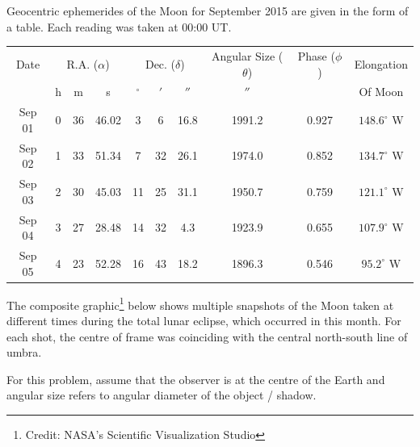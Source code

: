 Geocentric ephemerides of the Moon for September 2015 are given in the form
of a table. Each reading was taken at 00:00 UT.

\begin{center}
\begin{tabular}{c|ccc|ccc|c|c|c}
Date & \multicolumn{3}{c|}{R.A. ($\alpha$)}
  & \multicolumn{3}{c|}{Dec. ($\delta$)}
  & Angular Size ($\theta$) & Phase ($\phi$) & Elongation \\
 & h & m & s & $^\circ$ & $'$ & $''$ & $''$ & & Of Moon \\
\hline
Sep 01 & 0 & 36 & 46.02 & 3  & 6  & 16.8 & 1991.2 & 0.927 & $148.6^\circ$ W \\
Sep 02 & 1 & 33 & 51.34 & 7  & 32 & 26.1 & 1974.0 & 0.852 & $134.7^\circ$ W \\
Sep 03 & 2 & 30 & 45.03 & 11 & 25 & 31.1 & 1950.7 & 0.759 & $121.1^\circ$ W \\
Sep 04 & 3 & 27 & 28.48 & 14 & 32 & 4.3  & 1923.9 & 0.655 & $107.9^\circ$ W \\
Sep 05 & 4 & 23 & 52.28 & 16 & 43 & 18.2 & 1896.3 & 0.546 & $95.2^\circ$ W \\
\end{tabular}
\end{center}

The composite graphic\footnote{Credit: NASA's Scientific Visualization
Studio} below shows multiple snapshots of the Moon taken at different times
during the total lunar eclipse, which occurred in this month. For each shot,
the centre of frame was coinciding with the central north-south line of
umbra.

For this problem, assume that the observer is at the centre of the Earth and
angular size refers to angular diameter of the object / shadow.


